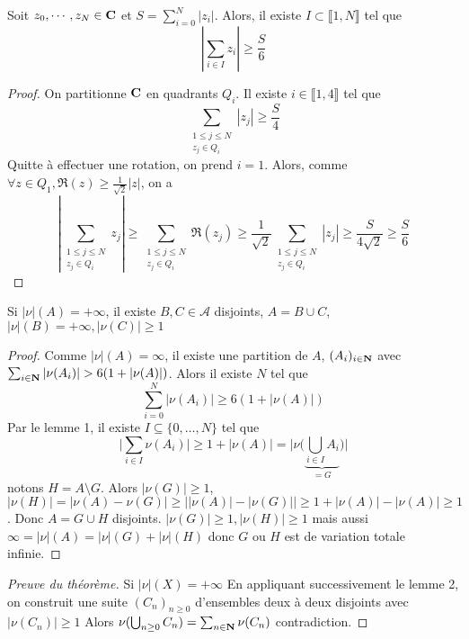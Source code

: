 \begin{lmm}
Soit $z_0, \cdots , z_N \in  \mathbf C$ et $S=\sum_{i=0}^N|z_i|$. Alors, il existe $I\subset \llbracket 1,N \rrbracket  $ tel que \[
\left|\sum_{i \in  I}z_i\right| \geq \frac S6
\] 
\end{lmm}

\begin{proof}
On partitionne $ \mathbf C$ en quadrants $Q_i$. Il existe  $i \in  \llbracket 1,4 \rrbracket $ tel que \[
    \sum_{\substack{1\leq j\leq N\\ z_j \in  Q_i}}|z_j| \geq \frac S4
\]
Quitte à effectuer une rotation, on prend $i=1$. Alors, comme  $\forall  z \in  Q_1, \Re(z)\geq \frac1{\sqrt 2}|z|$, on a \[
    \left|\sum_{\substack{1\leq j\leq N\\ z_j \in  Q_i}}z_j\right|\geq \sum_{\substack{1\leq j\leq N\\ z_j \in  Q_i}} \Re(z_j) \geq  \frac1{\sqrt 2}\sum_{\substack{1\leq j\leq N\\ z_j \in  Q_i}}|z_j| \geq \frac S{4\sqrt 2} \geq \frac S6
\] 
\end{proof}

\begin{lmm}
    Si $|\nu|(A)=+\infty$, il existe  $B, C \in  \mathcal  A$ disjoints, $A=B\cup C$,  $|\nu|(B)=+\infty,|\nu(C)|\geq 1$
\end{lmm}

\begin{proof}
Comme $|\nu|(A)=\infty$, il existe une partition de $A$, $(A_i)_{i\in \mathbf N}$ avec $\sum_{i\in \N}|\nu(A_i)|> 6(1+|\nu(A)|)$.
Alors il existe $N$ tel que \[ \sum_{i=0}^N|\nu(A_i)|\geq 6(1+|\nu(A)|)\]
Par le lemme 1, il existe $I\subseteq \{0,\dots,N\}$ tel que \[ \Big| \sum_{i\in I}\nu(A_i)\Big| \geq 1+|\nu(A)| =\Big|\nu\Big(\underbrace{\bigcup_{i\in I}A_i}_{=G}\Big)\Big|\] notons $H=A\setminus G$.
Alors $|\nu(G)|\geq 1$, $|\nu(H)|=|\nu(A)-\nu(G)|\geq \big| |\nu(A)|-|\nu(G)|\big|\geq 1+|\nu(A)|-|\nu(A)|\geq 1$.
Donc $A=G\cup H$ disjoints.
$|\nu(G)|\geq 1 ,|\nu(H)|\geq 1$
mais aussi $\infty=|\nu|(A)=|\nu|(G)+|\nu|(H)$ donc $G$ ou $H$ est de variation totale infinie.
\end{proof}

\begin{proof}[Preuve du théorème]
Si $|\nu|(X)=+\infty$
En appliquant successivement le lemme 2, on construit une suite $(C_n)_{n\geq 0}$ d'ensembles deux à deux disjoints avec $|\nu(C_n)|\geq 1$
Alors $\nu(\bigcup_{n\geq 0}C_n)=\sum_{n\in\mathbf N}\nu(C_n)$ contradiction.
\end{proof}

